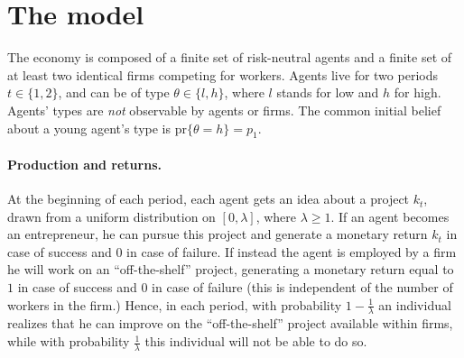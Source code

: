 \documentclass[12pt,american]{paper}
\theoremstyle{remark}
\begin{document}
\section{The model}\label{sec:model}
The economy is composed of a finite set of risk-neutral agents and a finite set of at least two identical firms competing for workers. Agents live for two periods $t\in\{1,2\}$, and can be of type $\theta\in\{l,h\}$, where $l$ stands for low and $h$ for high. Agents' types are \textit{not} observable by agents or firms. The common initial belief about a young agent's type is $\mbox{pr}\{\theta=h\}=p_1$.


\paragraph{Production and returns.}

At the beginning of each period,  each agent gets an idea about a project $k_t$, drawn  from a uniform distribution on $[0,\lambda]$, where $\lambda\geq 1$. If an agent becomes an entrepreneur, he can pursue this project and generate a monetary return $k_t$ in case of success and $0$ in case of failure. If instead the agent is employed by a firm he will work on an ``off-the-shelf'' project, generating a monetary return equal to $1$ in case of success and $0$ in case of failure (this is independent of the number of workers in the firm.) Hence, in each period, with probability $1-\frac{1}{\lambda}$ an individual realizes that he can improve on the ``off-the-shelf'' project available within firms, while with probability $\frac{1}{\lambda}$ this individual will not be able to do so.
\end{document}

